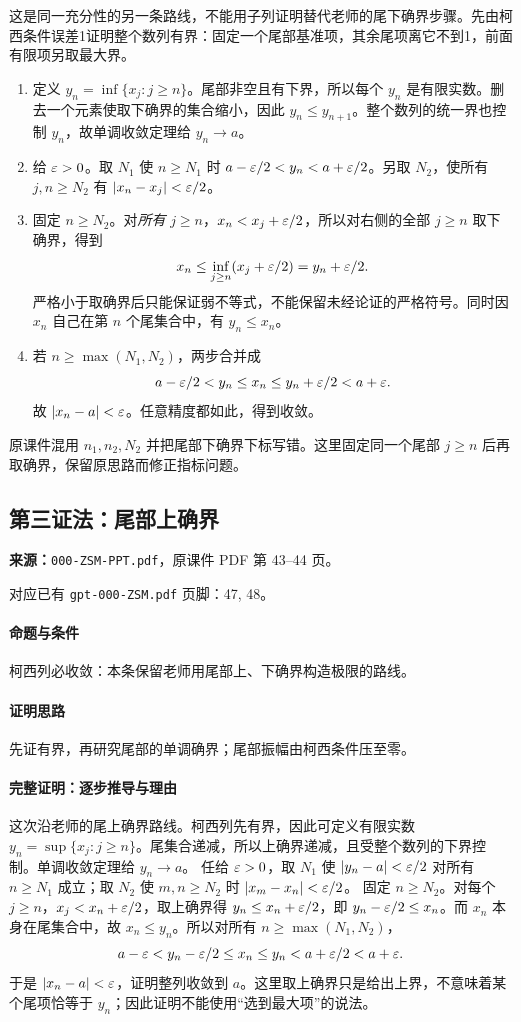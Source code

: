 这是同一充分性的另一条路线，不能用子列证明替代老师的尾下确界步骤。先由柯西条件误差1证明整个数列有界：固定一个尾部基准项，其余尾项离它不到1，前面有限项另取最大界。
\begin{enumerate}
\item 定义 $y_n=\inf\{x_j:j\ge n\}$。尾部非空且有下界，所以每个 $y_n$ 是有限实数。删去一个元素使取下确界的集合缩小，因此 $y_n\le y_{n+1}$。整个数列的统一界也控制 $y_n$，故单调收敛定理给 $y_n\to a$。
\item 给 $\varepsilon>0$。取 $N_1$ 使 $n\ge N_1$ 时 $a-\varepsilon/2<y_n<a+\varepsilon/2$。另取 $N_2$，使所有 $j,n\ge N_2$ 有 $|x_n-x_j|<\varepsilon/2$。
\item 固定 $n\ge N_2$。对\emph{所有} $j\ge n$，$x_n<x_j+\varepsilon/2$，所以对右侧的全部 $j\ge n$ 取下确界，得到
\[x_n\le\inf_{j\ge n}(x_j+\varepsilon/2)=y_n+\varepsilon/2.\]
严格小于取确界后只能保证弱不等式，不能保留未经论证的严格符号。同时因 $x_n$ 自己在第 $n$ 个尾集合中，有 $y_n\le x_n$。
\item 若 $n\ge\max(N_1,N_2)$，两步合并成
\[a-\varepsilon/2<y_n\le x_n\le y_n+\varepsilon/2<a+\varepsilon.\]
故 $|x_n-a|<\varepsilon$。任意精度都如此，得到收敛。
\end{enumerate}
原课件混用 $n_1,n_2,N_2$ 并把尾部下确界下标写错。这里固定同一个尾部 $j\ge n$ 后再取确界，保留原思路而修正指标问题。

\clearpage\subsection{第三证法：尾部上确界}
\textbf{来源：}\texttt{000-ZSM-PPT.pdf}，原课件 PDF 第 43--44 页。\par
对应已有 \texttt{gpt-000-ZSM.pdf} 页脚：47, 48。\par
\paragraph{命题与条件}柯西列必收敛：本条保留老师用尾部上、下确界构造极限的路线。
\paragraph{证明思路}先证有界，再研究尾部的单调确界；尾部振幅由柯西条件压至零。
\paragraph{完整证明：逐步推导与理由}

这次沿老师的尾上确界路线。柯西列先有界，因此可定义有限实数 $y_n=\sup\{x_j:j\ge n\}$。尾集合递减，所以上确界递减，且受整个数列的下界控制。单调收敛定理给 $y_n\to a$。
任给 $\varepsilon>0$，取 $N_1$ 使 $|y_n-a|<\varepsilon/2$ 对所有 $n\ge N_1$ 成立；取 $N_2$ 使 $m,n\ge N_2$ 时 $|x_m-x_n|<\varepsilon/2$。
固定 $n\ge N_2$。对每个 $j\ge n$，$x_j<x_n+\varepsilon/2$，取上确界得 $y_n\le x_n+\varepsilon/2$，即 $y_n-\varepsilon/2\le x_n$。而 $x_n$ 本身在尾集合中，故 $x_n\le y_n$。所以对所有 $n\ge\max(N_1,N_2)$，
\[a-\varepsilon<y_n-\varepsilon/2\le x_n\le y_n<a+\varepsilon/2<a+\varepsilon.\]
于是 $|x_n-a|<\varepsilon$，证明整列收敛到 $a$。这里取上确界只是给出上界，不意味着某个尾项恰等于 $y_n$；因此证明不能使用“选到最大项”的说法。


